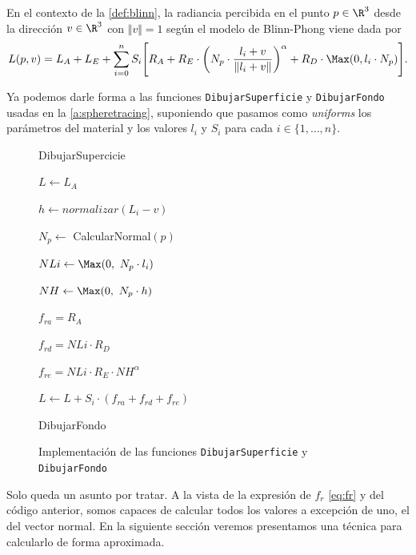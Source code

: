 \begin{definicion}\label{def:phong}
    En el contexto de la \autoref{def:blinn}, la radiancia percibida en el punto $p\in\R^3$ desde la dirección $v\in\R^3$ con $\Vert v \Vert = 1$ según el modelo de Blinn-Phong viene dada por
    \begin{equation*}
        L(p,v) = L_A+L_E+ \sum_{i=0}^n S_i \Bigg[ R_A + R_E\cdot \left(N_p\cdot \frac{l_i + v}{\Vert l_i + v\Vert} \right)^{\alpha} + R_D\cdot \Max(0,l_i\cdot N_p) \Bigg].
    \end{equation*}
\end{definicion}

Ya podemos darle forma a las funciones \texttt{DibujarSuperficie} y \texttt{DibujarFondo} usadas en la \autoref{a:spheretracing}, suponiendo que pasamos como \textit{uniforms} los parámetros del material y los valores $l_i$ y $S_i$ para cada $i\in \{1,\dots, n\}$.
\begin{figure}[ht!]
    \centering
    
       \begin{algorithm}[H]
            \caption{DibujarSupercicie}
                $L \gets L_A$ 
                 {

                    
                    $h \gets normalizar(L_i - v)$ 
                    
                    $N_p \gets$ CalcularNormal$(p)$
                    
                    $NLi \gets \Max(0,\ N_p\cdot l_i)$
                    
                    $NH \gets \Max(0,\ N_p \cdot h)$\newline

                    $f_{ra} = R_A$
                    
                    $f_{rd} = NLi\cdot R_D$
                    
                    $f_{re} = NLi \cdot R_E \cdot NH^{\alpha}$\newline

                    $L \gets L + S_i\cdot (f_{ra} + f_{rd} + f_{re})$
                }

        \end{algorithm}
    \begin{algorithm}[H]
            \caption{DibujarFondo}
        \end{algorithm}

        \caption{Implementación de las funciones \texttt{DibujarSuperficie} y \texttt{DibujarFondo}}
\end{figure}
Solo queda un asunto por tratar. A la vista de la expresión de $f_r$ \eqref{eq:fr} y del código anterior, somos capaces de calcular todos los valores a excepción de uno, el del vector normal. En la siguiente sección veremos presentamos una técnica para calcularlo de forma aproximada. 
